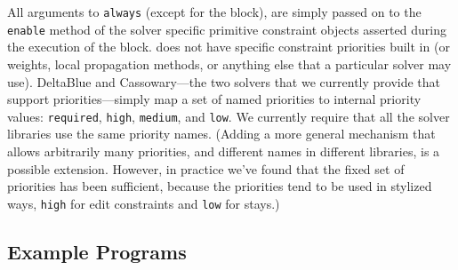 All arguments to \lstinline{always} (except for the block), are simply
passed on to the \lstinline{enable} method of the solver specific
primitive constraint objects asserted during the execution of the
block. \toolname does not have specific constraint priorities built in
(or weights, local propagation methods, or anything else that a particular
solver may use). DeltaBlue and Cassowary---the two solvers that we
currently provide that support priorities---simply map a set of named
priorities to internal priority values: \lstinline{required},
\lstinline{high}, \lstinline{medium}, and \lstinline{low}. 
We currently require that all the solver libraries use the same
priority names.  (Adding a more general mechanism that allows
arbitrarily many priorities, and different names in different
libraries, is a possible extension.  However, in practice we've found
that the fixed set of priorities has been sufficient, because the priorities
tend to be used in stylized ways, \eg \lstinline{high} for edit
constraints and \lstinline{low} for stays.)





\subsection{Example Programs}

